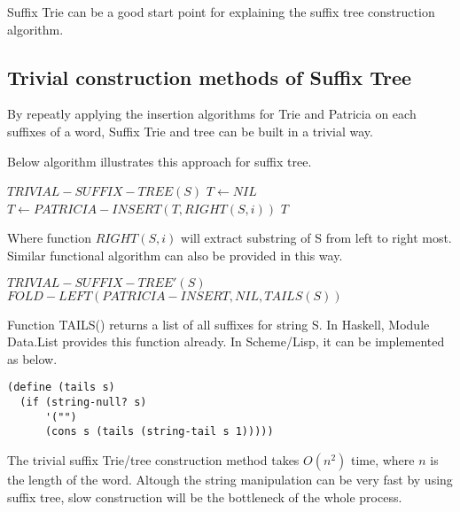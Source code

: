 \documentclass{article}
\begin{document}
Suffix Trie can be a good start point for explaining the suffix tree construction algorithm.

\subsection{Trivial construction methods of Suffix Tree}
\label{trivial-cons}

By repeatly applying the insertion algorithms\cite{lxy-trie} for Trie and Patricia
on each suffixes of a word, Suffix Trie and tree can be built in a trivial way.

Below algorithm illustrates this approach for suffix tree.

\begin{algorithmic}
\STATE $TRIVIAL-SUFFIX-TREE(S)$
  \STATE $T \leftarrow NIL$
    \STATE $T \leftarrow PATRICIA-INSERT(T, RIGHT(S, i))$
  \ENDFOR
  \RETURN $T$
\end{algorithmic}

Where function $RIGHT(S, i)$ will extract substring of S from left to right most.
Similar functional algorithm can also be provided in this way.

\begin{algorithmic}
\STATE $TRIVIAL-SUFFIX-TREE'(S)$
  \RETURN $FOLD-LEFT(PATRICIA-INSERT, NIL, TAILS(S))$
\end{algorithmic}

Function TAILS() returns a list of all suffixes for string S. In Haskell, Module 
Data.List provides this function already. In Scheme/Lisp, it can be implemented as below.

\lstset{language=lisp}
\begin{lstlisting}
(define (tails s)
  (if (string-null? s)
      '("")
      (cons s (tails (string-tail s 1)))))
\end{lstlisting}

The trivial suffix Trie/tree construction method takes $O(n^2)$ time, where $n$ is the 
length of the word. Altough the string manipulation can be very fast by using suffix
tree, slow construction will be the bottleneck of the whole process.

\end{document}
